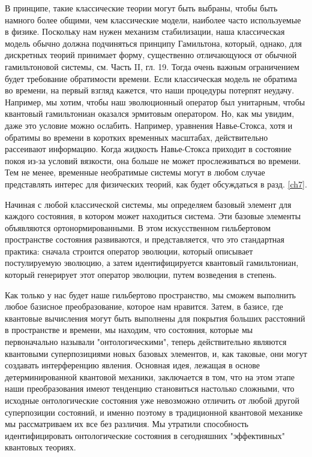 \documentclass[main.tex]{subfiles}
\begin{document}
В принципе, такие классические теории могут быть выбраны, чтобы быть намного более общими, чем классические модели, наиболее часто используемые в физике. Поскольку нам нужен механизм стабилизации, наша классическая модель обычно должна подчиняться принципу Гамильтона, который, однако, для дискретных теорий принимает форму, существенно отличающуюся от обычной гамильтоновой системы, см. Часть II, гл. 19. Тогда очень важным ограничением будет требование обратимости времени. Если классическая модель не обратима во времени, на первый взгляд кажется, что наши процедуры потерпят неудачу. Например, мы хотим, чтобы наш эволюционный оператор был унитарным, чтобы квантовый гамильтониан оказался эрмитовым оператором. Но, как мы увидим, даже это условие можно ослабить. Например, уравнения Навье-Стокса, хотя и обратимы во времени в коротких временных масштабах, действительно рассеивают информацию. Когда жидкость Навье-Стокса приходит в состояние покоя из-за условий вязкости, она больше не может прослеживаться во времени. Тем не менее, временные необратимые системы могут в любом случае представлять интерес для физических теорий, как будет обсуждаться в разд. \ref{ch7}.

Начиная с любой классической системы, мы определяем базовый элемент для каждого состояния, в котором может находиться система. Эти базовые элементы объявляются ортонормированными. В этом искусственном гильбертовом пространстве состояния развиваются, и представляется, что это стандартная практика: сначала строится оператор эволюции, который описывает постулируемую эволюцию, а затем идентифицируется квантовый гамильтониан, который генерирует этот оператор эволюции, путем возведения в степень.

Как только у нас будет наше гильбертово пространство, мы сможем выполнить любое базисное преобразование, которое нам нравится. Затем, в базисе, где квантовые вычисления могут быть выполнены для покрытия больших расстояний в пространстве и времени, мы находим, что состояния, которые мы первоначально называли "онтологическими", теперь действительно являются квантовыми суперпозициями новых базовых элементов, и, как таковые, они могут создавать интерференцию явления. Основная идея, лежащая в основе детерминированной квантовой механики, заключается в том, что на этом этапе наши преобразования имеют тенденцию становиться настолько сложными, что исходные онтологические состояния уже невозможно отличить от любой другой суперпозиции состояний, и именно поэтому в традиционной квантовой механике мы рассматриваем их все без различия. Мы утратили способность идентифицировать онтологические состояния в сегодняшних "эффективных" квантовых теориях.
\end{document}
